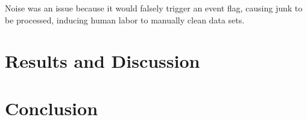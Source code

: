 \documentclass[aps,prl,preprint,groupedaddress]{revtex4}
\begin{document}
Noise was an issue because it would falsely trigger an event flag, causing junk to be processed, inducing human labor to manually clean data sets. 

\section{Results and Discussion}



\section{Conclusion}




%


\end{document}
